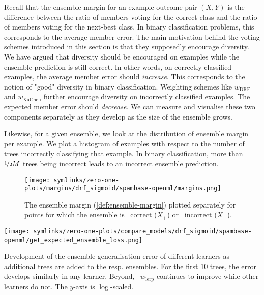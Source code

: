 \documentclass[../main.tex]{subfiles}
\begin{document}
Recall that the ensemble margin for an example-outcome pair $(X,Y)$ is the difference between the ratio of members voting for the correct class and the ratio of members voting for the next-best class. In binary classification problems, this corresponds to the average member error. 
The main motivation behind the voting schemes introduced in this section is that they supposedly encourage diversity. We have argued that diversity should be encouraged on examples while the ensemble prediction is still correct. In other words, on correctly classified examples, the average member error should \textit{increase}.
This corresponds to the notion of "good" diversity in binary classification. Weighting schemes like $w_{\text{DRF}}$ and $w_{\text{XuChen}}$ further encourage diversity on incorrectly classified examples. The expected member error should \textit{decrease}. 
We can measure and visualise these two components separately as they develop as the size of the ensemble grows.


Likewise, for a given ensemble, we look at the distribution of ensemble margin per example. We plot a histogram of examples with respect to the number of trees incorrectly classifying that example. In binary classification, more than $\nicefrac{1}{2}M$ trees being incorrect leads to an incorrect ensemble prediction. %

\begin{figure*}
    \texttt{[image: symlinks/zero-one-plots/margins/drf\_sigmoid/spambase-openml/margins.png]}
    \caption{
        The ensemble margin (\cf \ref{def:ensemble-margin}) plotted separately for points for which the ensemble is ~correct ($X_+$) or ~incorrect ($X_-$).
    }
    \label{fig:margins}
\end{figure*}


\begin{marginfigure}
    \texttt{[image: symlinks/zero-one-plots/compare\_models/drf\_sigmoid/spambase-openml/get\_expected\_ensemble\_loss.png]} 
    \caption{Development of the ensemble generalisation error of different learners as additional trees are added to the resp. ensembles. For the first 10 trees, the error develops similarly in any learner. Beyond, ~$w_\text{lerp}$ continues to improve while other learners do not.
    The $y$-axis is $\log$-scaled.
    } 
    \label{fig:ensemble-loss-spambase-openml}
\end{marginfigure}
\end{document}
